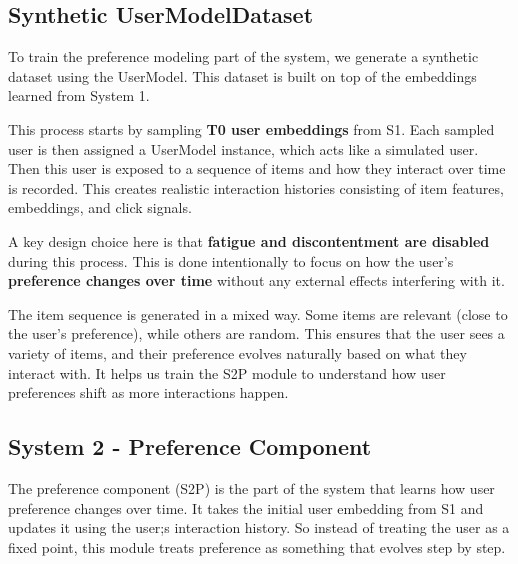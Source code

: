 

\subsection{Synthetic UserModelDataset}

To train the preference modeling part of the system, we generate a synthetic dataset using the UserModel. 
This dataset is built on top of the embeddings learned from System 1.

This process starts by sampling \textbf{T0 user embeddings} from S1. 
Each sampled user is then assigned a UserModel instance, which acts like a simulated user. 
Then this user is exposed to a sequence of items and how they interact over time is recorded. 
This creates realistic interaction histories consisting of item features, embeddings, and click signals.

A key design choice here is that \textbf{fatigue and discontentment are disabled} during this process.
This is done intentionally to focus on how the user's \textbf{preference changes over time} without any external effects interfering with it.

The item sequence is generated in a mixed way. 
Some items are relevant (close to the user's preference), while others are random. 
This ensures that the user sees a variety of items, and their preference evolves naturally based on what they interact with.
It helps us train the S2P module to understand how user preferences shift as more interactions happen.



\subsection{System 2 - Preference Component}

The preference component (S2P) is the part of the system that learns how user preference changes over time. 
It takes the initial user embedding from S1 and updates it using the user;s interaction history. 
So instead of treating the user as a fixed point, this module treats preference as something that evolves step by step.


